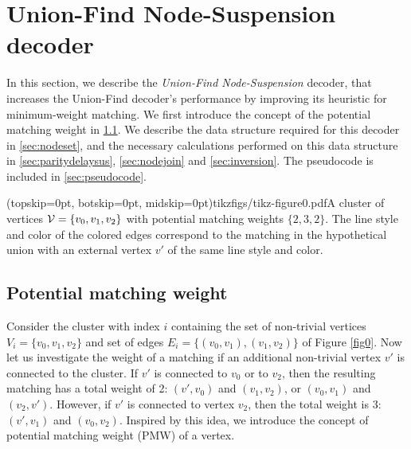 \section{Union-Find Node-Suspension decoder}\label{sec:ufbb}

In this section, we describe the \emph{Union-Find Node-Suspension} decoder, that increases the Union-Find decoder's performance by improving its heuristic for minimum-weight matching. We first introduce the concept of the potential matching weight in \ref{sec:matchingweight}. We describe the data structure required for this decoder in \ref{sec:nodeset}, and the necessary calculations performed on this data structure in \ref{sec:paritydelaysus}, \ref{sec:nodejoin} and \ref{sec:inversion}. The pseudocode is included in \ref{sec:pseudocode}. 

\Figure[htb](topskip=0pt, botskip=0pt, midskip=0pt){tikzfigs/tikz-figure0.pdf}{A cluster of vertices $\mathcal{V}=\{v_0, v_1, v_2\}$ with potential matching weights $\{2, 3, 2\}$. The line style and color of the colored edges correspond to the matching in the hypothetical union with an external vertex $v'$ of the same line style and color.\label{fig0}}

\subsection{Potential matching weight}\label{sec:matchingweight}

Consider the cluster with index $i$ containing the set of non-trivial vertices $V_i=\{v_0,v_1,v_2\}$ and set of edges $E_i=\{(v_0,v_1), (v_1, v_2)\}$ of Figure \ref{fig0}. Now let us investigate the weight of a matching if an additional non-trivial vertex $v'$ is connected to the cluster. If $v'$ is connected to $v_0$ or to $v_2$, then the resulting matching has a total weight of 2: $(v',v_0)$ and $(v_1,v_2)$, or $(v_0,v_1)$ and $(v_2,v')$. However, if $v'$ is connected to vertex $v_2$, then the total weight is 3: $(v', v_1)$ and $(v_0, v_2)$. Inspired by this idea, we introduce the concept of potential matching weight (PMW) of a vertex. 

